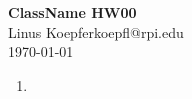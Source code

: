 \documentclass[12pt]{article}
\begin{document}
\begin{center}
	{\large \textbf{ClassName HW00}}\\
	Linus Koepfer\quad\textperiodcentered\quad koepfl@rpi.edu\quad\textperiodcentered{}\\
\today
\end{center}

\begin{enumerate}
	\item
\end{enumerate}
\end{document}
